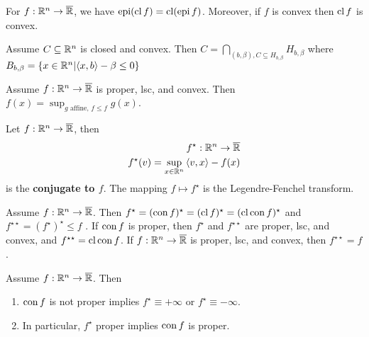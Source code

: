 \begin{thm}
  \label{sec:conjugate-functions-3}
  For $f: \mathbb{R}^{n} \rightarrow \overline {\mathbb{R}}$, we have $\operatorname*{epi} (\operatorname*{cl} f) =
  \operatorname*{cl} (\operatorname*{epi} f)$.  Moreover, if $f$ is convex then $\operatorname*{cl} f$ is convex.
\end{thm}

\begin{thm}
  \label{sec:conjugate-functions-4}
  Assume $C \subseteq \mathbb{R}^{n}$ is closed and convex.  Then $C =
  \bigcap_{(b, \beta), C \subseteq H_{b, \beta}} H_{b, \beta}$ where
  $B_{b, \beta} = \{ x \in \R^{n} | \IP{x, b} - \beta \leq 0 \} $
\end{thm}

\begin{thm}
  \label{sec:conjugate-functions-5}
  Assume $f: \mathbb{R}^{n} \rightarrow \overline {\mathbb{R}}$ is proper, lsc, and
  convex.  Then $f(x) = \sup_{\text{$g$ affine, $f \leq f$}} g(x)$.
\end{thm}

\begin{defn}
  \label{sec:conjugate-functions-6}
  Let $f: \mathbb{R}^{n} \rightarrow \overline {\mathbb{R}}$, then
  \begin{align}
    \label{eq:8}
    f^{\star}: \R^{n} \rightarrow \overline \R \\
    f^{\star}(v) = \sup_{x \in \R^{n}} \IP{v, x} - f(x)
  \end{align} is the \textbf{conjugate to $f$}.  The mapping $f
  \mapsto f^{\star}$ is the Legendre-Fenchel transform.
\end{defn}

\begin{thm}
  \label{sec:conjugate-functions-7}
  Assume $f: \mathbb{R}^{n} \rightarrow \overline {\mathbb{R}}$.  Then $f^{\star} =
  (\operatorname*{con} f)^{\star} = (\operatorname*{cl} f)^{\star} = (\operatorname*{cl} \operatorname*{con} f)^{\star}$ and
  $f^{\star \star} = (f^{\star})^{\star} \leq f$ .  If $\operatorname*{con} f$ is
  proper, then $f^{\star}$ and $f^{\star \star}$ are proper, lsc, and
  convex, and $f^{\star \star} = \operatorname*{cl} \operatorname*{con} f$.  If $f: \mathbb{R}^{n}
  \rightarrow \overline {\mathbb{R}}$ is proper, lsc, and convex, then $f^{\star
  \star} = f$.
\end{thm}

\begin{thm}
  \label{sec:conjugate-functions-8}
  Assume $f: \mathbb{R}^{n} \rightarrow \overline {\mathbb{R}}$.  Then
  \begin{enumerate}
  \item $\operatorname*{con} f$ is not proper implies $f^{\star} \equiv +\infty$ or
    $f^{\star} \equiv -\infty$.
  \item In particular, $f^{\star}$ proper implies $\operatorname*{con} f$ is proper.
  \end{enumerate}
\end{thm}

